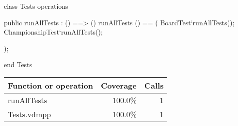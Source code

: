 \begin{vdm_al}
class Tests
 operations

 public runAllTests : () ==> ()
 runAllTests () == (
  BoardTest`runAllTests();
  ChampionshipTest`runAllTests();

 );

end Tests
\end{vdm_al}
\bigskip
\begin{longtable}{|l|r|r|}
\hline
Function or operation & Coverage & Calls \\
\hline
\hline
runAllTests & 100.0\% & 1 \\
\hline
\hline
Tests.vdmpp & 100.0\% & 1 \\
\hline
\end{longtable}

